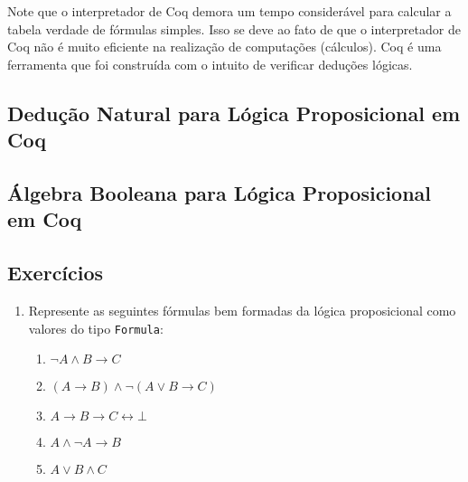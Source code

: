 Note que o interpretador de Coq demora um tempo considerável para
calcular a tabela verdade de fórmulas simples. Isso se deve ao fato de
que o interpretador de Coq não é muito eficiente na realização de
computações (cálculos). Coq é uma ferramenta que foi construída com o
intuito de verificar deduções lógicas.

\subsection{Dedução Natural para Lógica Proposicional em Coq}



\subsection{Álgebra Booleana para Lógica Proposicional em Coq}

\subsection{Exercícios}

\begin{enumerate}
    \item Represente as seguintes fórmulas bem formadas da lógica
      proposicional como valores do tipo \texttt{Formula}:
   \begin{enumerate}
       \item $\neg A \land B \to C$
       \item $(A \to B) \land \neg (A \lor B \to C)$
       \item $A \to B \to C \leftrightarrow \bot$
       \item $A \land \neg A \to B$
       \item $A \lor B \land C$
   \end{enumerate}
\end{enumerate}
